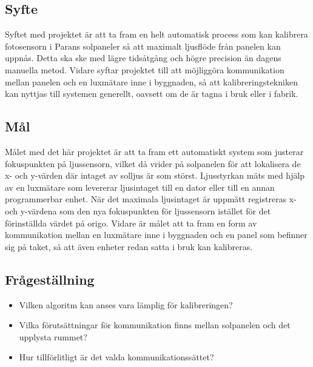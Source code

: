     \subsection{Syfte} %
    \label{sub:syfte}
          Syftet med projektet är att ta fram en helt automatisk process som kan kalibrera fotosensorn i Parans solpaneler så att maximalt ljusflöde från panelen kan uppnås. Detta ska ske med lägre tidsåtgång och högre precision än dagens manuella metod. 
          Vidare syftar projektet till att möjliggöra kommunikation mellan panelen och en luxmätare inne i byggnaden, så att kalibreringstekniken kan nyttjas till systemen generellt, oavsett om de är tagna i bruk eller i fabrik.

    \subsection{Mål} %
    \label{sub:mal}
        Målet med det här projektet är att ta fram ett automatiskt system som justerar fokuspunkten på ljussensorn, vilket då vrider på solpanelen för att lokalisera de x- och y-värden där intaget av solljus är som störst. 
        Ljusstyrkan mäts med hjälp av en luxmätare som levererar ljusintaget till en dator eller till en annan programmerbar enhet. 
        När det maximala ljusintaget är uppmätt registreras x- och y-värdena som den nya fokuspunkten för ljussensorn istället för det förinställda värdet på origo. 
        Vidare är målet att ta fram en form av kommunikation mellan en luxmätare inne i byggnaden och en panel som befinner sig på taket, så att även enheter redan satta i bruk kan kalibreras. 


    \subsection{Frågeställning} %
    \label{sub:fragestallning}
        \begin{itemize}
            \item Vilken algoritm kan anses vara lämplig för kalibreringen?
            \item Vilka förutsättningar för kommunikation finns mellan solpanelen och det upplysta rummet? 
            \item Hur tillförlitligt är det valda kommunikationssättet? 
            
        \end{itemize}

